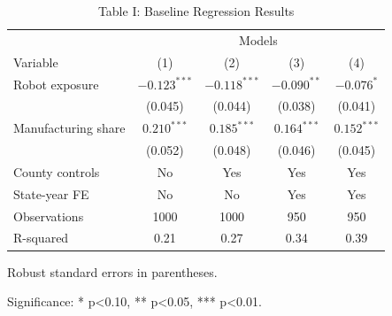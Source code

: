\documentclass{article}
\begin{document}
\begin{table}[htbp]
\centering
\caption{Table I: Baseline Regression Results}
\begin{threeparttable}
\begin{tabular}{lcccc}
\toprule
 & \multicolumn{4}{c}{Models} \\
Variable & (1) & (2) & (3) & (4) \\
\midrule
Robot exposure & $-0.123^{***}$ & $-0.118^{***}$ & $-0.090^{**}$ & $-0.076^{*}$ \\
 & (0.045) & (0.044) & (0.038) & (0.041) \\
Manufacturing share & $0.210^{***}$ & $0.185^{***}$ & $0.164^{***}$ & $0.152^{***}$ \\
 & (0.052) & (0.048) & (0.046) & (0.045) \\
County controls & No & Yes & Yes & Yes \\
State-year FE & No & No & Yes & Yes \\
Observations & 1000 & 1000 & 950 & 950 \\
R-squared & 0.21 & 0.27 & 0.34 & 0.39 \\
\bottomrule
\end{tabular}
\begin{tablenotes}[flushleft]
\item Robust standard errors in parentheses.
\item Significance: * p<0.10, ** p<0.05, *** p<0.01.
\end{tablenotes}
\end{threeparttable}
\end{table}
\end{document}
